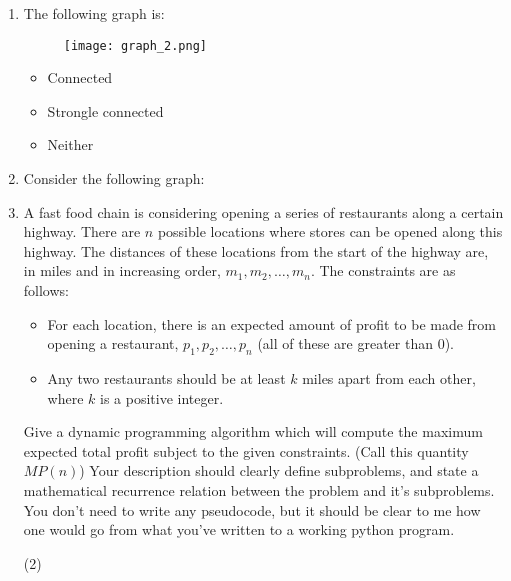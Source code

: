 \documentclass[12pt]{article}
\begin{document}
\newpage
\begin{enumerate}
    \item The following graph is:
    \begin{wrapfigure}{h}{5cm}
        \texttt{[image: graph\_2.png]}
    \end{wrapfigure}      
    \begin{itemize}
        \item Connected
        \item Strongle connected
        \item Neither
    \end{itemize}
   
    \item Consider the following graph:
    \item A fast food chain is considering opening a series of restaurants along a certain highway. There are $n$ possible locations where stores can be opened along this highway. The distances of these locations from the start of the highway are, in miles and in increasing order, $m_1, m_2, \ldots, m_n$. The constraints are as follows:
    \begin{itemize}
        \item For each location, there is an expected amount of profit to be made from opening a restaurant, $p_1, p_2, \ldots, p_n$ (all of these are greater than $0$).
        \item Any two restaurants should be at least $k$ miles apart from each other, where $k$ is a positive integer. 
    \end{itemize} 
    Give a dynamic programming algorithm which will compute the maximum expected total profit subject to the given constraints. (Call this quantity $MP(n)$) Your description should clearly define subproblems, and state a mathematical recurrence relation between the problem and it's subproblems. You don't need to write any pseudocode, but it should be clear to me how one would go from what you've written to a working python program. 

    \item[(2)] 
\end{enumerate}
\end{document}
